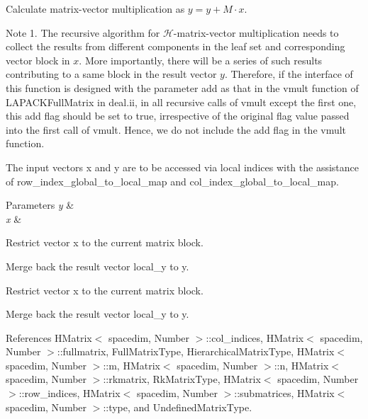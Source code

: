 Calculate matrix-\/vector multiplication as $y = y + M \cdot x$.


\begin{DoxyDescription}
\item[Note ]1. The recursive algorithm for $\mathcal{H}$-\/matrix-\/vector multiplication needs to collect the results from different components in the leaf set and corresponding vector block in $x$. More importantly, there will be a series of such results contributing to a same block in the result vector $y$. Therefore, if the interface of this function is designed with the parameter {\ttfamily add} as that in the {\ttfamily vmult} function of {\ttfamily L\+A\+P\+A\+C\+K\+Full\+Matrix} in deal.\+ii, in all recursive calls of {\ttfamily vmult} except the first one, this {\ttfamily add} flag should be set to {\ttfamily true}, irrespective of the original flag value passed into the first call of {\ttfamily vmult}. Hence, we do not include the {\ttfamily add} flag in the {\ttfamily vmult} function.
\begin{DoxyEnumerate}
\item The input vectors {\ttfamily x} and {\ttfamily y} are to be accessed via local indices with the assistance of {\ttfamily row\+\_\+index\+\_\+global\+\_\+to\+\_\+local\+\_\+map} and {\ttfamily col\+\_\+index\+\_\+global\+\_\+to\+\_\+local\+\_\+map}. 
\end{DoxyEnumerate}
\end{DoxyDescription}


\begin{DoxyParams}{Parameters}
{\em y} & \\
\hline
{\em x} & \\
\hline
\end{DoxyParams}
Restrict vector x to the current matrix block.

Merge back the result vector {\ttfamily local\+\_\+y} to {\ttfamily y}.

Restrict vector x to the current matrix block.

Merge back the result vector {\ttfamily local\+\_\+y} to {\ttfamily y}.

References H\+Matrix$<$ spacedim, Number $>$\+::col\+\_\+indices, H\+Matrix$<$ spacedim, Number $>$\+::fullmatrix, Full\+Matrix\+Type, Hierarchical\+Matrix\+Type, H\+Matrix$<$ spacedim, Number $>$\+::m, H\+Matrix$<$ spacedim, Number $>$\+::n, H\+Matrix$<$ spacedim, Number $>$\+::rkmatrix, Rk\+Matrix\+Type, H\+Matrix$<$ spacedim, Number $>$\+::row\+\_\+indices, H\+Matrix$<$ spacedim, Number $>$\+::submatrices, H\+Matrix$<$ spacedim, Number $>$\+::type, and Undefined\+Matrix\+Type.



